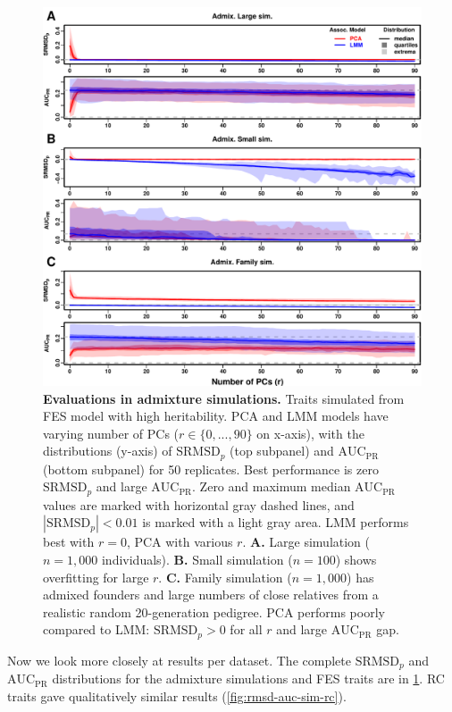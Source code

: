 \documentclass[11pt]{article}
\newcommand{\rmsd}{\text{SRMSD}_p}
\newcommand{\auc}{\text{AUC}_\text{PR}}
\begin{document}
\begin{linenumbers}
\begin{figure}[hp]
  \centering
  \includegraphics[width=\textwidth,height=\textheight,keepaspectratio]{fes/rmsd-auc-sim.pdf}
  \caption{
    {\bf Evaluations in admixture simulations.}
    Traits simulated from FES model with high heritability.
    PCA and LMM models have varying number of PCs ($r \in \{0, ..., 90\}$ on x-axis), with the distributions (y-axis) of $\rmsd$ (top subpanel) and $\auc$ (bottom subpanel) for 50 replicates.
    Best performance is zero $\rmsd$ and large $\auc$.
    Zero and maximum median $\auc$ values are marked with horizontal gray dashed lines, and $|\rmsd| < 0.01$ is marked with a light gray area.
    LMM performs best with $r=0$, PCA with various $r$.
    \textbf{A.}
    Large simulation ($n = 1,000$ individuals).
    \textbf{B.}
    Small simulation ($n = 100$) shows overfitting for large $r$.
    \textbf{C.}
    Family simulation ($n = 1,000$) has admixed founders and large numbers of close relatives from a realistic random 20-generation pedigree.
    PCA performs poorly compared to LMM: $\rmsd > 0$ for all $r$ and large $\auc$ gap.
  }
  \label{fig:rmsd-auc-sim}
\end{figure}

Now we look more closely at results per dataset.
The complete $\rmsd$ and $\auc$ distributions for the admixture simulations and FES traits are in \cref{fig:rmsd-auc-sim}.
RC traits gave qualitatively similar results (\cref{fig:rmsd-auc-sim-rc}).


\end{linenumbers}
\end{document}
